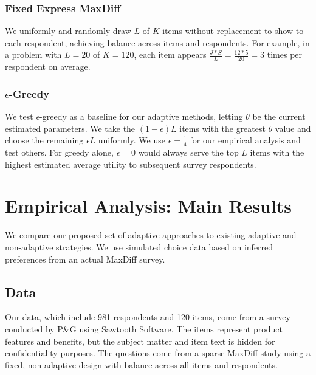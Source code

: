 \documentclass[a4paper,11pt]{article}
\newcommand{\numperset}{L}
\begin{document}


\subsubsection{Fixed Express MaxDiff}
We uniformly and randomly draw $\numperset$ of $K$ items without replacement to show to each respondent, achieving balance across items and respondents. For example, in a problem with $\numperset=20$ of $K=120$, each item appears $\frac{J*S}{L} = \frac{12*5}{20} = 3$ times per respondent on average.

\subsubsection{$\epsilon$-Greedy}
We test $\epsilon$-greedy as a baseline for our adaptive methods, letting $\theta$ be the current estimated parameters. We take the $(1-\epsilon)L$ items with the greatest $\theta$ value and choose the remaining $\epsilon L$ uniformly. We use $\epsilon=\frac{1}{4}$ for our empirical analysis and test others. For greedy alone, $\epsilon=0$ would always serve the top $\numperset$ items with the highest estimated average utility to subsequent survey respondents.

\section{Empirical Analysis: Main Results}

\label{sec:empirical_main}
We compare our proposed set of adaptive approaches to existing adaptive and non-adaptive strategies. We use simulated choice data based on inferred preferences from an actual MaxDiff survey.

\subsection{Data}
Our data, which include 981 respondents and 120 items, come from a survey conducted by P\&G using Sawtooth Software. The items represent product features and benefits, but the subject matter and item text is hidden for confidentiality purposes. The questions come from a sparse MaxDiff study using a fixed, non-adaptive design with balance across all items and respondents. 
\end{document}
